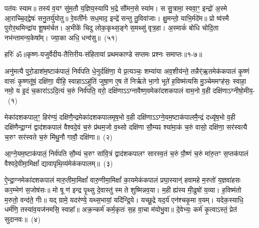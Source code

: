 पत॑यः स्याम॥ तस्य॑ व॒यꣳ सु॑म॒तौ य॒ज्ञिय॒स्यापि॑ भ॒द्रे सौ॑मन॒से स्या॑म। स सु॒त्रामा॒ स्ववा॒ꣳ॒ इन्द्रो॑ अ॒स्मे आ॒राच्चि॒द्द्वेषः॑ सनु॒तर्यु॑योतु॥ रे॒वती᳚र्नः सध॒माद॒ इन्द्रे॑ सन्तु तु॒विवा॑जाः। क्षु॒मन्तो॒ याभि॒र्मदे॑म॥ प्रो ष्व॑स्मै पुरोर॒थमिन्द्रा॑य शू॒षम॑र्चत। अ॒भीके॑ चिदु लोक॒कृथ्स॒ङ्गे स॒मथ्सु॑ वृत्र॒हा। अ॒स्माकं॑ बोधि चोदि॒ता नभ॑न्तामन्य॒केषा᳚म्। ज्या॒का अधि॒ धन्व॑सु॥~(५१)\ip

{\anuvakamend[{ज॒रसा॒ मा ते॑ हर्यश्व सु॒वीर्य॒स्याध्येकं॑ च}]}%

{हरिः॑ ॐ}{॥कृष्ण-यजुर्वेदीय-तैत्तिरीय-संहितायां प्रथमकाण्डे सप्तमः प्रश्नः समाप्तः॥१-७॥}



\setcounter{anuvakam}{0}
अनु॑मत्यै पुरो॒डाश॑\-म॒ष्टा\-क॑पालं॒ निर्व॑पति धे॒नुर्दक्षि॑णा॒ ये प्र॒त्यञ्चः॒ शम्या॑या अव॒शीय॑न्ते॒ तन्नैर्॑ऋ॒तमेक॑कपालं कृ॒ष्णं वासः॑ कृ॒ष्णतू॑षं॒ दक्षि॑णा॒ वीहि॒ स्वाहा\-ऽऽ\-हु॑तिं जुषा॒ण ए॒ष ते॑ निर्\mbox{}ऋते भा॒गो भूते॑ ह॒विष्म॑त्यसि मु॒ञ्चेममꣳह॑सः॒ स्वाहा॒ नमो॒ य इ॒दं च॒कारा॑\-ऽऽ\-दि॒त्यं च॒रुं निर्व॑पति॒ वरो॒ दक्षि॑णा\-ऽऽ\-ग्नावैष्ण॒वमेका॑\-दश\-कपालं वाम॒नो व॒ही दक्षि॑णा\-ऽग्नीषो॒मीय॒-~(१)\ip

मेका॑\-दश\-कपाल॒ꣳ॒ हिर॑ण्यं॒ दक्षि॑णै॒न्द्रमेका॑\-दश\-कपालमृष॒भो व॒ही दक्षि॑णा\-ऽऽ\-ग्ने॒यम॒ष्टाक॑पालमै॒न्द्रं दध्यृ॑ष॒भो व॒ही दक्षि॑णैन्द्रा॒ग्नं द्वाद॑श\-कपालं वैश्वदे॒वं च॒रुं प्र॑थम॒जो व॒थ्सो दक्षि॑णा सौ॒म्यꣴ श्या॑मा॒कं च॒रुं वासो॒ दक्षि॑णा॒ सर॑स्वत्यै च॒रुꣳ सर॑स्वते च॒रुं मि॑थु॒नौ गावौ॒ दक्षि॑णा॥~(२)\ip

{\anuvakamend[{अ॒ग्नी॒षो॒मीयं॒ चतु॑स्त्रिꣳशच्च}]}

आ॒ग्ने॒यम॒ष्टा\-क॑पालं॒ निर्व॑पति सौ॒म्यं च॒रुꣳ सा॑वि॒त्रं द्वाद॑श\-कपालꣳ सारस्व॒तं च॒रुं पौ॒ष्णं च॒रुं मा॑रु॒तꣳ स॒प्तक॑पालं वैश्वदे॒वीमा॒मिक्षां᳚ द्यावा\-पृथि॒व्य॑मेक॑कपालम्॥~(३)\ip

{\anuvakamend[{आ॒ग्ने॒यम॒ष्टाद॑श}]}

ऐ॒न्द्रा॒ग्नमेका॑\-दश\-कपालं मारु॒तीमा॒मिक्षां᳚ वारु॒णीमा॒मिक्षां᳚ का॒यमेक॑कपालं प्रघा॒स्यान्॑ हवामहे म॒रुतो॑ य॒ज्ञवा॑हसः कर॒म्भेण॑ स॒जोष॑सः॥ मो षू ण॑ इन्द्र पृ॒थ्सु दे॒वास्तु॑ स्म ते शुष्मिन्नव॒या। म॒ही ह्य॑स्य मी॒ढुषो॑ य॒व्या। ह॒विष्म॑तो म॒रुतो॒ वन्द॑ते॒ गीः॥ यद् ग्रामे॒ यदर॑ण्ये॒ यथ्स॒भायां॒ यदि॑न्द्रि॒ये। यच्छू॒द्रे यद॒र्य॑ एन॑श्चकृ॒मा व॒यम्। यदेक॒स्याधि॒ धर्म॑णि॒ तस्या॑व॒यज॑नमसि॒ स्वाहा᳚॥ अक्र॒न्कर्म॑ कर्म॒कृतः॑ स॒ह वा॒चा म॑योभु॒वा॥ दे॒वेभ्यः॒ कर्म॑ कृ॒त्वा\-ऽस्तं॒ प्रेत॑ सुदानवः॥~(४)\ip


